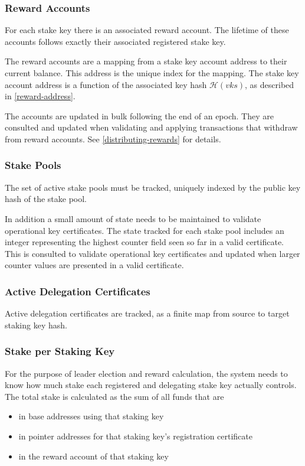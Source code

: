 \documentclass[11pt,a4paper]{article}
\begin{document}
\subsubsection{Reward Accounts}
\label{reward-accounts}

For each stake key there is an associated reward account. The lifetime of
these accounts follows exactly their associated registered stake key.

The reward accounts are a mapping from a stake key account address to
their current balance. This address is the unique index for the mapping.
The stake key account address is a function of the associated key hash
\(\mathcal{H}(vks)\), as described in \cref{reward-address}.

The accounts are updated in bulk following the end of an epoch. They are
consulted and updated when validating and applying transactions that
withdraw from reward accounts. See \cref{distributing-rewards} for
details.

\subsubsection{Stake Pools}
\label{stake-pools}

The set of active stake pools must be tracked, uniquely indexed
by the public key hash of the stake pool.

In addition a small amount of state needs to be maintained to validate
operational key certificates. The state tracked for each stake pool includes
an integer representing the highest counter field seen so far in a valid
certificate. This is consulted to validate operational key certificates and
updated when larger counter values are presented in a valid certificate.

\subsubsection{Active Delegation Certificates}
\label{active-delegation-certificates}

Active delegation certificates are tracked, as a finite map from
source to target staking key hash.

\subsubsection{Stake per Staking Key}
\label{stake-per-staking-key}

For the purpose of leader election and reward calculation, the system
needs to know how much stake each registered and delegating stake key
actually controls. The total stake is calculated as the sum of all
funds that are
\begin{itemize}
\item in base addresses using that staking key
\item in pointer addresses for that staking key's registration
  certificate
\item in the reward account of that staking key
\end{itemize}
\end{document}

